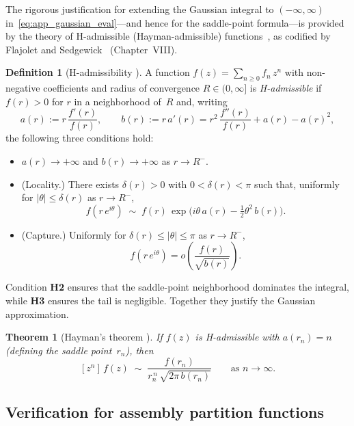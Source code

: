 \documentclass[11pt]{amsart}
\theoremstyle{definition}
\newtheorem{definition}{Definition}
\theoremstyle{plain}
\newtheorem{theorem}{Theorem}
\theoremstyle{remark}
\begin{document}
The rigorous justification for extending the Gaussian integral to $(-\infty,\infty)$ in~\eqref{eq:app_gaussian_eval}---and hence for the saddle-point formula---is provided by the theory of H-admissible (Hayman-admissible) functions~\cite{hayman1956generalisation}, as codified by Flajolet and Sedgewick~\cite{flajolet2009analytic} (Chapter~VIII).

\begin{definition}[H-admissibility {\cite[Definition~VIII.1]{flajolet2009analytic}}]
\label{def:h_admissible}
A function $f(z)=\sum_{n\ge 0}f_n\,z^n$ with non-negative coefficients and radius of convergence $R\in(0,\infty]$ is \emph{H-admissible} if $f(r)>0$ for $r$ in a neighborhood of~$R$ and, writing
\[
a(r) := r\,\frac{f'(r)}{f(r)},\qquad
b(r) := r\,a'(r) = r^2\,\frac{f''(r)}{f(r)} + a(r) - a(r)^2,
\]
the following three conditions hold:
\begin{itemize}
\item[\textbf{H1.}] $a(r)\to+\infty$ and $b(r)\to+\infty$ as $r\to R^-$.
\item[\textbf{H2.}] (Locality.) There exists $\delta(r)>0$ with $0<\delta(r)<\pi$ such that, uniformly for $|\theta|\le\delta(r)$ as $r\to R^-$,
\[
f(r\,e^{i\theta})\;\sim\; f(r)\,\exp\!\bigl(i\theta\,a(r) - \tfrac{1}{2}\theta^2\,b(r)\bigr).
\]
\item[\textbf{H3.}] (Capture.) Uniformly for $\delta(r)\le|\theta|\le\pi$ as $r\to R^-$,
\[
f(r\,e^{i\theta}) = o\!\left(\frac{f(r)}{\sqrt{b(r)}}\right).
\]
\end{itemize}
\end{definition}

\noindent
Condition \textbf{H2} ensures that the saddle-point neighborhood dominates the integral, while \textbf{H3} ensures the tail is negligible.
Together they justify the Gaussian approximation.

\begin{theorem}[Hayman's theorem {\cite[Theorem~VIII.4]{flajolet2009analytic}}]
\label{thm:hayman}
If $f(z)$ is H-admissible with $a(r_n)=n$ (defining the saddle point~$r_n$), then
\[
[z^n]\,f(z) \;\sim\; \frac{f(r_n)}{r_n^{\,n}\,\sqrt{2\pi\,b(r_n)}}
\qquad\text{as } n\to\infty.
\]
\end{theorem}

\subsection{Verification for assembly partition functions}
\label{app:saddle_verification}
\end{document}
